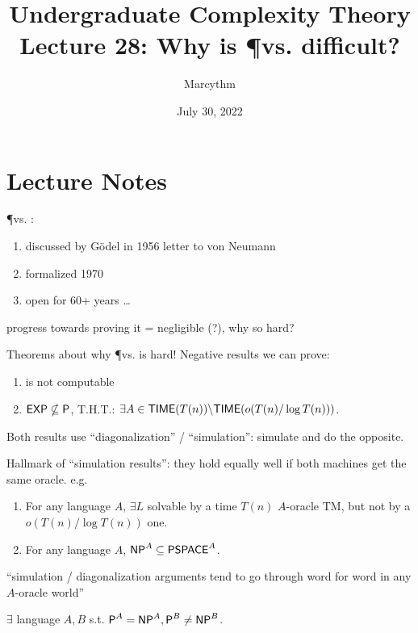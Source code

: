 \documentclass{article}
\title{Undergraduate Complexity Theory \\ Lecture 28: Why is \P vs. \NP difficult?}
\author{Marcythm}
\date{July 30, 2022}
\begin{document}
\maketitle{}

\section{Lecture Notes}

\begin{mdframed}
  \P vs. \NP:
  \begin{enumerate}
    \item discussed by Gödel in 1956 letter to von Neumann
    \item formalized 1970
    \item open for 60+ years \ldots
  \end{enumerate}
  progress towards proving it = negligible (?), why so hard?
\end{mdframed}

Theorems about why \P vs. \NP is hard!
Negative results we can prove:
\begin{enumerate}
  \item {} is not computable
  \item \(\text{\sf EXP} \nsubseteq \text{\sf P}\), T.H.T.: \(\exists A \in \text{\sf TIME}(T(n)) \backslash \text{\sf TIME}(o(T(n) / \log T(n)))\).
\end{enumerate}

Both results use ``diagonalization'' / ``simulation'': simulate and do the opposite.

\begin{mdframed}
  Hallmark of ``simulation results'': they hold equally well if both machines get the same oracle. e.g.
  \begin{enumerate}
    \item For any language \(A\), \(\exists L\) solvable by a time \(T(n)\) \(A\)-oracle TM, but not by a \(o(T(n) / \log T(n))\) one.
    \item For any language \(A\), \(\text{\sf NP}^A \subseteq \text{\sf PSPACE}^A\).
  \end{enumerate}
  ``simulation / diagonalization arguments tend to go through word for word in any \(A\)-oracle world''
\end{mdframed}

\begin{theorem}
  \(\exists\) language \(A, B\) s.t. \(\text{\sf P}^A = \text{\sf NP}^A, \text{\sf P}^B \neq \text{\sf NP}^B\).
\end{theorem}
\end{document}
